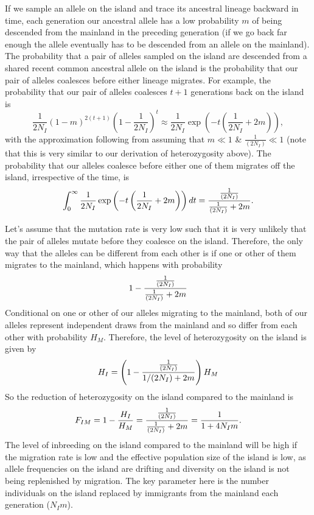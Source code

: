 If we sample an allele on the island and trace its ancestral
lineage backward in time, each generation our ancestral allele has a low
probability $m$ of being descended from the mainland in the preceding
generation (if we go back far enough the allele eventually has to be
descended from an allele on the mainland). The probability that a pair of alleles sampled on the
island are descended from a shared recent common ancestral allele on the island is the
probability that our pair of alleles coalesces before either lineage
migrates. For example, the probability that our pair of alleles
coalesces $t+1$ generations back on the island is 
\begin{equation}
\frac{1}{2N_I}(1-m)^{2(t+1)} \left(1-\frac{1}{2N_I} \right)^{t} \approx
\frac{1}{2N_I} \exp\left( -t\left (\frac{1}{2N_I} + 2m\right) \right),
\end{equation}
with the approximation following from assuming that $m \ll 1$ \& $\frac{1}{(2N_I)}
\ll 1$ (note that this is very similar to our derivation of
heterozygosity above). The probability that our alleles coalesce before either one
of them migrates off the island, irrespective of the time, is
\begin{equation}
\int_0^{\infty} \frac{1}{2N_I} \exp\left( -t\left (\frac{1}{2N_I} +
2m\right) \right) dt = \frac{\nicefrac{1}{(2N_I)}}{\nicefrac{1}{(2N_I)} +
    2m}.
\end{equation}

Let's assume that the mutation rate is very low such that it is very
unlikely that the pair of alleles mutate before they coalesce on the
island. Therefore, the only way that the alleles can be different from
each other is if one or other of them migrates to the mainland, which
happens with probability  
\begin{equation}
  1 - \frac{\nicefrac{1}{(2N_I)}}{\nicefrac{1}{(2N_I)} + 2m}
\end{equation}
Conditional on one or other of our alleles migrating to the mainland, both of our alleles represent independent draws from the mainland and so differ from each other with probability $H_M$. Therefore, the level of
heterozygosity on the island is given by
\begin{equation}
  H_I = \left(1 - \frac{\nicefrac{1}{(2N_I)}}{1/(2N_I) + 2m} \right)H_M
\end{equation}
So the reduction of heterozygosity on the island compared to the
mainland is
\begin{equation}
  F_{IM} = 1- \frac{H_I}{H_M} = \frac{\nicefrac{ 1}{(2N_I)}}{\nicefrac{1}{(2N_I)} + 2m} = \frac{ 1 }{1 + 4N_Im}.
\end{equation}
The level of inbreeding on the island compared to the mainland will be high if the migration rate is low and the effective population size of the island is low, as allele frequencies on the island are drifting and diversity on the island is not being replenished by migration. The
key parameter here is the number individuals on the island replaced by immigrants from the mainland each generation ($N_I m$).

